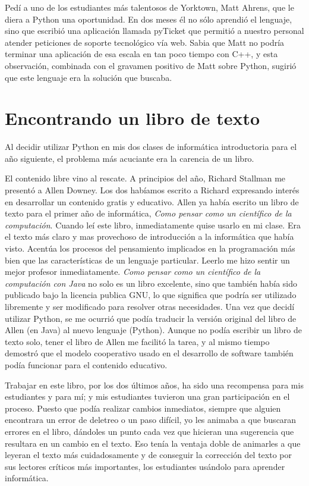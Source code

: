 Pedí a uno de los estudiantes más talentosos de Yorktown, Matt Ahrens,
que le diera a Python una oportunidad. En dos meses él no sólo aprendió
el lenguaje, sino que escribió una aplicación llamada pyTicket que
permitió a nuestro personal atender peticiones de soporte tecnológico
vía web. Sabia que Matt no podría terminar una aplicación de esa escala
en tan poco tiempo con C++, y esta observación, combinada con el gravamen
positivo de Matt sobre Python, sugirió que este lenguaje era la solución
que buscaba.

\section*{Encontrando un libro de texto}

Al decidir utilizar Python en mis dos clases de informática introductoria
para el año siguiente, el problema más acuciante era la carencia de
un libro.

El contenido libre vino al rescate. A principios del año, Richard
Stallman me presentó a Allen Downey. Los dos habíamos escrito a Richard
expresando interés en desarrollar un contenido gratis y educativo.
Allen ya había escrito un libro de texto para el primer año de informática,
{\em Como pensar como un científico de la computación}. Cuando
leí este libro, inmediatamente quise usarlo en mi clase. Era el texto
más claro y mas provechoso de introducción a la informática que había
visto. Acentúa los procesos del pensamiento implicados en la programación
más bien que las características de un lenguaje particular. Leerlo
me hizo sentir un mejor profesor inmediatamente. {\em Como pensar
como un científico de la computación con Java} no solo es un libro
excelente, sino que también había sido publicado bajo la licencia
publica GNU, lo que significa que podría ser utilizado libremente
y ser modificado para resolver otras necesidades. Una vez que decidí
utilizar Python, se me ocurrió que podía traducir la versión original
del libro de Allen (en Java) al nuevo lenguaje (Python). Aunque no
podía escribir un libro de texto solo, tener el libro de Allen me
facilitó la tarea, y al mismo tiempo demostró que el modelo cooperativo
usado en el desarrollo de software también podía funcionar para el
contenido educativo.

Trabajar en este libro, por los dos últimos años, ha sido una recompensa
para mis estudiantes y para mí; y mis estudiantes tuvieron una gran
participación en el proceso. Puesto que podía realizar cambios inmediatos,
siempre que alguien encontrara un error de deletreo o un paso difícil,
yo les animaba a que buscaran errores en el libro, dándoles un punto
cada vez que hicieran una sugerencia que resultara en un cambio en
el texto. Eso tenía la ventaja doble de animarles a que leyeran el
texto más cuidadosamente y de conseguir la corrección del texto por
sus lectores críticos más importantes, los estudiantes usándolo para
aprender informática.

